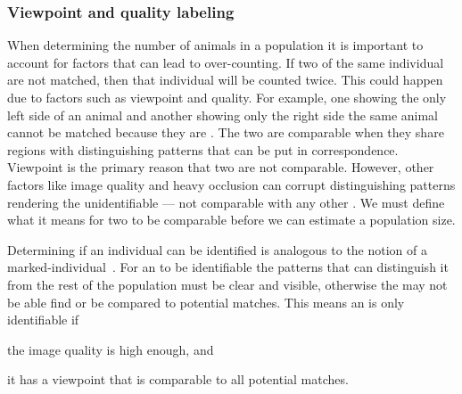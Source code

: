             \DetectFigure{}

        \subsubsection{Viewpoint and quality labeling}\label{sub:viewqual}
            When determining the number of animals in a population it is important to account for factors that can lead
            to over-counting. If two \annots{} of the same individual are not matched, then that individual will be
            counted twice. This could happen due to factors such as viewpoint and quality. For example, one \annot{}
            showing the only left side of an animal and another \annot{} showing only the right side the same animal
            cannot be matched because they are . The two \annots{} are comparable when they
            share regions with distinguishing patterns that can be put in correspondence. Viewpoint is the primary
            reason that two \annots{} are not comparable. However, other factors like image quality and heavy occlusion
            can corrupt distinguishing patterns rendering the \annot{} unidentifiable --- not comparable with any other
            \annot{}. We must define what it means for two \annots{} to be comparable before we can estimate a
            population size.

            Determining if an individual can be identified is analogous to the
            notion of a marked-individual~\cite{seber_estimation_1982}. For an
            \annot{} to be identifiable the patterns that can distinguish it
            from the rest of the population must be clear and visible, otherwise
            the \annot{} may not be able find or be compared to potential
            matches. This means an \annot{} is only identifiable if
            \begin{enumin}
                \item the image quality is high enough, and %
                \item it has a viewpoint that is comparable to all potential
                matches. %
            \end{enumin}
            
